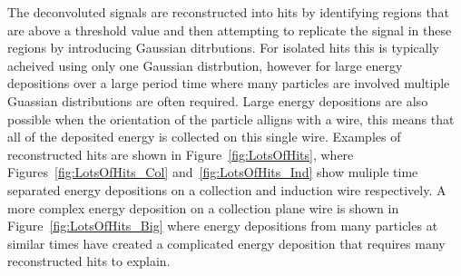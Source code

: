 The deconvoluted signals are reconstructed into hits by identifying regions that are above a threshold value and then attempting to replicate the signal in these regions by introducing Gaussian ditrbutions. For isolated hits this is typically acheived using only one Gaussian distrbution, however for large energy depositions over a large period time where many particles are involved multiple Guassian distributions are often required. Large energy depositions are also possible when the orientation of the particle alligns with a wire, this means that all of the deposited energy is collected on this single wire. Examples of reconstructed hits are shown in Figure~\ref{fig:LotsOfHits}, where Figures~\ref{fig:LotsOfHits_Col} and~\ref{fig:LotsOfHits_Ind} show muliple time separated energy depositions on a collection and induction wire respectively. A more complex energy deposition on a collection plane wire is shown in Figure~\ref{fig:LotsOfHits_Big} where energy depositions from many particles at similar times have created a complicated energy deposition that requires many reconstructed hits to explain. \\


